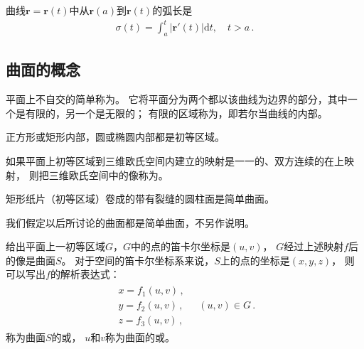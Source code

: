 \begin{corollary}
    曲线$\bm r=\bm r(t)$中从$\bm r(a)$到$\bm r(t)$的弧长是
    \begin{align}\label{eq:03ex01.8}
        \sigma(t)=\int_a^t{|\bm r'(t)|\mathrm{d}t},\quad t>a\, .
    \end{align}
\end{corollary}

\subsection{曲面的概念}\label{sub:曲面的概念}
\begin{definition}
    平面上不自交的简单称为。
    它将平面分为两个都以该曲线为边界的部分，其中一个是有限的，另一个是无限的；
    有限的区域称为，即若尔当曲线的内部。
\end{definition}
\begin{example}
    正方形或矩形内部，圆或椭圆内部都是初等区域。
\end{example}

\begin{definition}
    如果平面上初等区域到三维欧氏空间内建立的映射是一一的、双方连续的在上映射，
    则把三维欧氏空间中的像称为。
\end{definition}
\begin{example}
    矩形纸片（初等区域）卷成的带有裂缝的圆柱面是简单曲面。
\end{example}

我们假定以后所讨论的曲面都是简单曲面，不另作说明。

给出平面上一初等区域$G$，$G$中的点的笛卡尔坐标是$(u,v)$，
$G$经过上述映射$f$后的像是曲面$S$。
对于空间的笛卡尔坐标系来说，$S$上的点的坐标是$(x,y,z)$，
则可以写出$f$的解析表达式：
\begin{align}\label{eq:03ex01.9}
    \begin{array}{l}
        x=f_1(u,v)\, , \\
        y=f_2(u,v)\, , \\
        z=f_3(u,v)\, ,
    \end{array}\quad (u,v)\in G\, .
\end{align}
称为曲面$S$的或，
$u$和$v$称为曲面的或。

